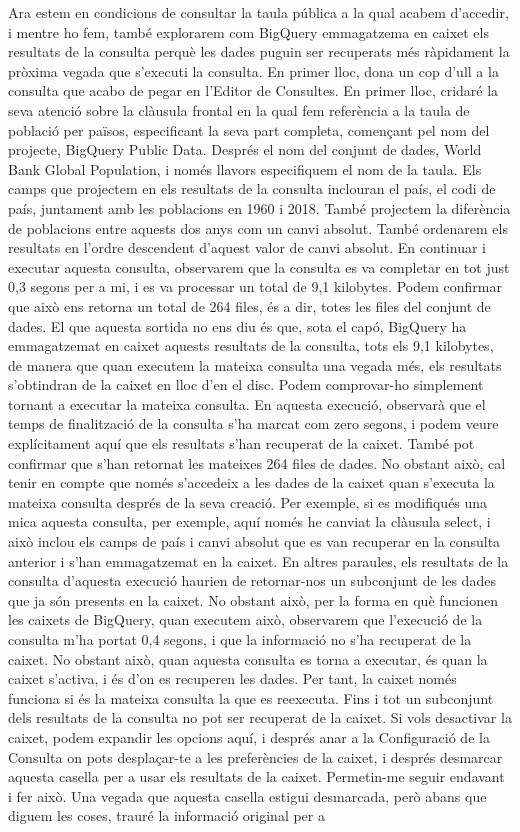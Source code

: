 \documentclass[12pt,longbibliography]{article}
\theoremstyle{definition}
\theoremstyle{remark}
\begin{document}
Ara estem en condicions de consultar la taula pública a la qual acabem d'accedir, i mentre ho fem, també explorarem com BigQuery emmagatzema en caixet els resultats de la consulta perquè les dades puguin ser recuperats més ràpidament la pròxima vegada que s'executi la consulta. En primer lloc, dona un cop d'ull a la consulta que acabo de pegar en l'Editor de Consultes. En primer lloc, cridaré la seva atenció sobre la clàusula frontal en la qual fem referència a la taula de població per països, especificant la seva part completa, començant pel nom del projecte, BigQuery Public Data. Després el nom del conjunt de dades, World Bank Global Population, i només llavors especifiquem el nom de la taula. Els camps que projectem en els resultats de la consulta inclouran el país, el codi de país, juntament amb les poblacions en 1960 i 2018. També projectem la diferència de poblacions entre aquests dos anys com un canvi absolut. També ordenarem els resultats en l'ordre descendent d'aquest valor de canvi absolut. En continuar i executar aquesta consulta, observarem que la consulta es va completar en tot just 0,3 segons per a mi, i es va processar un total de 9,1 kilobytes. Podem confirmar que això ens retorna un total de 264 files, és a dir, totes les files del conjunt de dades. El que aquesta sortida no ens diu és que, sota el capó, BigQuery ha emmagatzemat en caixet aquests resultats de la consulta, tots els 9,1 kilobytes, de manera que quan executem la mateixa consulta una vegada més, els resultats s'obtindran de la caixet en lloc d'en el disc. Podem comprovar-ho simplement tornant a executar la mateixa consulta. En aquesta execució, observarà que el temps de finalització de la consulta s'ha marcat com zero segons, i podem veure explícitament aquí que els resultats s'han recuperat de la caixet. També pot confirmar que s'han retornat les mateixes 264 files de dades. No obstant això, cal tenir en compte que només s'accedeix a les dades de la caixet quan s'executa la mateixa consulta després de la seva creació. Per exemple, si es modifiqués una mica aquesta consulta, per exemple, aquí només he canviat la clàusula select, i això inclou els camps de país i canvi absolut que es van recuperar en la consulta anterior i s'han emmagatzemat en la caixet. En altres paraules, els resultats de la consulta d'aquesta execució haurien de retornar-nos un subconjunt de les dades que ja són presents en la caixet. No obstant això, per la forma en què funcionen les caixets de BigQuery, quan executem això, observarem que l'execució de la consulta m'ha portat 0,4 segons, i que la informació no s'ha recuperat de la caixet. No obstant això, quan aquesta consulta es torna a executar, és quan la caixet s'activa, i és d'on es recuperen les dades. Per tant, la caixet només funciona si és la mateixa consulta la que es reexecuta. Fins i tot un subconjunt dels resultats de la consulta no pot ser recuperat de la caixet. Si vols desactivar la caixet, podem expandir les opcions aquí, i després anar a la Configuració de la Consulta on pots desplaçar-te a les preferències de la caixet, i després desmarcar aquesta casella per a usar els resultats de la caixet. Permetin-me seguir endavant i fer això. Una vegada que aquesta casella estigui desmarcada, però abans que diguem les coses, trauré la informació original per a 
\end{document}
